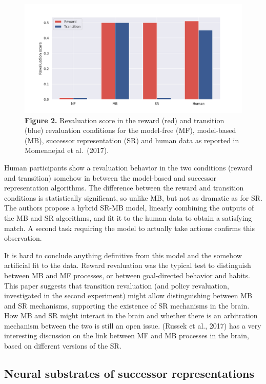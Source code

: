\documentclass[
  11pt,
]{article}
\begin{document}
\begin{figure}
\centering
\includegraphics{img/sr_results.png}
\caption{\textbf{Figure 2.} Revaluation score in the reward (red) and
transition (blue) revaluation conditions for the model-free (MF),
model-based (MB), successor representation (SR) and human data as
reported in Momennejad et al.~(2017).}
\end{figure}

Human participants show a revaluation behavior in the two conditions
(reward and transition) somehow in between the model-based and successor
representation algorithms. The difference between the reward and
transition conditions is statistically significant, so unlike MB, but
not as dramatic as for SR. The authors propose a hybrid SR-MB model,
linearly combining the outputs of the MB and SR algorithms, and fit it
to the human data to obtain a satisfying match. A second task requiring
the model to actually take actions confirms this observation.

It is hard to conclude anything definitive from this model and the
somehow artificial fit to the data. Reward revaluation was the typical
test to distinguish between MB and MF processes, or between
goal-directed behavior and habits. This paper suggests that transition
revaluation (and policy revaluation, investigated in the second
experiment) might allow distinguishing between MB and SR mechanisms,
supporting the existence of SR mechanisms in the brain. How MB and SR
might interact in the brain and whether there is an arbitration
mechanism between the two is still an open issue. (Russek et al., 2017)
has a very interesting discussion on the link between MF and MB
processes in the brain, based on different versions of the SR.

\hypertarget{neural-substrates-of-successor-representations}{%
\subsection{Neural substrates of successor
representations}\label{neural-substrates-of-successor-representations}}
\end{document}

